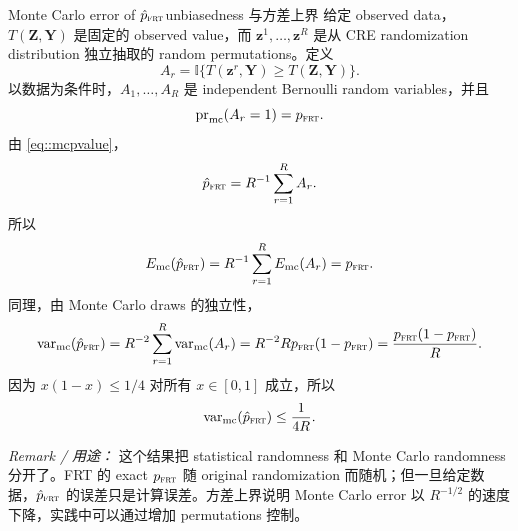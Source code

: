 \begin{exercisesolution}{Monte Carlo error of $\hat p_{\textsc{frt}}$}{unbiasedness 与方差上界}
给定 observed data，$T(\boldsymbol{Z},\boldsymbol{Y})$ 是固定的 observed value，而 $\boldsymbol{z}^1,\ldots,\boldsymbol{z}^R$ 是从 CRE randomization distribution 独立抽取的 random permutations。定义
\[
A_r=\mathbb{I}\{T(\boldsymbol{z}^r,\boldsymbol{Y})\geq T(\boldsymbol{Z},\boldsymbol{Y})\}.
\]
以数据为条件时，$A_1,\ldots,A_R$ 是 independent Bernoulli random variables，并且
\[
\textup{pr}_{\mathrm{mc}}(A_r=1)=p_{\textsc{frt}}.
\]
由 \cref{eq::mcpvalue}，
\[
\hat p_{\textsc{frt}}=R^{-1}\sum_{r=1}^R A_r.
\]
所以
\[
E_{\mathrm{mc}}(\hat p_{\textsc{frt}})
=R^{-1}\sum_{r=1}^R E_{\mathrm{mc}}(A_r)
=p_{\textsc{frt}}.
\]
同理，由 Monte Carlo draws 的独立性，
\[
\textup{var}_{\mathrm{mc}}(\hat p_{\textsc{frt}})
=R^{-2}\sum_{r=1}^R \textup{var}_{\mathrm{mc}}(A_r)
=R^{-2}R p_{\textsc{frt}}(1-p_{\textsc{frt}})
=\frac{p_{\textsc{frt}}(1-p_{\textsc{frt}})}{R}.
\]
因为 $x(1-x)\leq 1/4$ 对所有 $x\in[0,1]$ 成立，所以
\[
\textup{var}_{\mathrm{mc}}(\hat p_{\textsc{frt}})\leq \frac{1}{4R}.
\]

\emph{Remark / 用途：} 这个结果把 statistical randomness 和 Monte Carlo randomness 分开了。FRT 的 exact $p_{\textsc{frt}}$ 随 original randomization 而随机；但一旦给定数据，$\hat p_{\textsc{frt}}$ 的误差只是计算误差。方差上界说明 Monte Carlo error 以 $R^{-1/2}$ 的速度下降，实践中可以通过增加 permutations 控制。
\end{exercisesolution}

